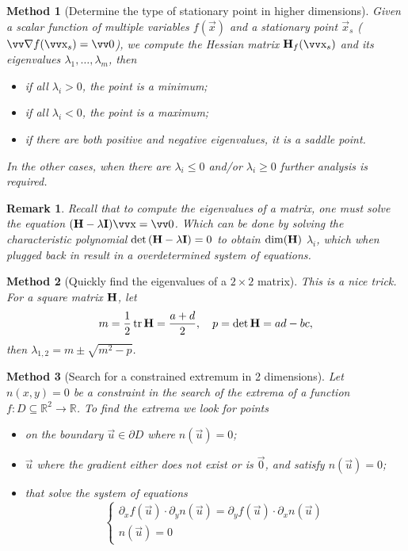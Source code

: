 \documentclass[twocolumn, margin=small]{tex/hsrzf}
\theoremstyle{fuvarzf}
\newtheorem{method}{Method}
\newtheorem{remark}{Remark}
\DeclareMathOperator{\tr}{\mathrm{tr}}
\begin{document}
\begin{method}[Determine the type of stationary point in higher dimensions]
  Given a scalar function of multiple variables \(f(\vec{x})\) and a stationary
  point \(\vec{x}_s\) (\(\grad f(\vec{x}_s) = \vec{0}\)), we compute the
  Hessian matrix \(\mx{H}_f(\vec{x}_s)\) and its eigenvalues \(\lambda_1,
  \ldots, \lambda_m\), then
  \begin{itemize}
    \item if all \(\lambda_i > 0\), the point is a minimum;
    \item if all \(\lambda_i < 0\), the point is a maximum;
    \item if there are both positive and negative eigenvalues,
      it is a saddle point.
  \end{itemize}
  In the other cases, when there are \(\lambda_i \leq 0\) and/or \(\lambda_i
  \geq 0\) further analysis is required.
\end{method}

\begin{remark}
  Recall that to compute the eigenvalues of a matrix, one must solve the
  equation \((\mx{H} - \lambda\mx{I})\vec{x} = \vec{0}\). Which can be done
  by solving the characteristic polynomial \(\det\left(\bm{\mathrm{H}} -
  \lambda\bm{\mathrm{I}}\right) = 0\) to obtain \(\dim(\bm{\mathrm{H}})\) \(\lambda_i\), which
  when plugged back in result in a overdetermined system of equations.
\end{remark}

\begin{method}[Quickly find the eigenvalues of a \(2\times 2\) matrix]
  This is a nice trick. For a square matrix \(\bm{\mathrm{H}}\), let
  \[
    m = \frac{1}{2}\tr \mx{H} = \frac{a + d}{2} ,
    \quad
    p = \det\mx{H} = ad - bc ,
  \]
  then \(\lambda_{1,2} = m \pm \sqrt{m^2 - p}\).
\end{method}

\begin{method}[Search for a constrained extremum in 2 dimensions]
  Let \(n(x,y) = 0\) be a constraint in the search of the extrema of a function
  \(f: D \subseteq \mathbb{R}^2 \to \mathbb{R}\). To find the extrema we look for
  points
  \begin{itemize}
    \item on the boundary \(\vec{u} \in \partial D\)
      where \(n(\vec{u}) = 0\);

    \item \(\vec{u}\) where the gradient either does not exist or is
      \(\vec{0}\), and satisfy \(n(\vec{u}) = 0\);

    \item that solve the system of equations
      \[
        \begin{cases}
          \partial_x f(\vec{u}) \cdot \partial_y n(\vec{u})
            = \partial_y f(\vec{u}) \cdot \partial_x n(\vec{u}) \\
          n(\vec{u}) = 0
        \end{cases}
      \]
  \end{itemize}
\end{method}
\end{document}
